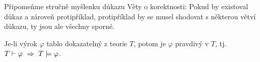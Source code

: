 Připomeňme stručně myšlenku důkazu Věty o korektnosti: Pokud by existoval důkaz a zároveň protipříklad, protipříklad by se musel shodovat s některou větví důkazu, ty jsou ale všechny sporné.

\begin{theorem}[O korektnosti]
Je-li výrok $\varphi$ tablo dokazatelný z teorie $T$, potom je $\varphi$ pravdivý v $T$, tj. $T\proves\varphi\ \Rightarrow\ T\models\varphi$.    
\end{theorem}






